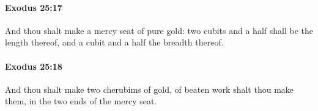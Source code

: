 		\paragraph{Exodus 25:17} %
			\label{EXODUS-25-17}

			And thou shalt make a mercy seat of pure gold: two cubits and a half shall be the length thereof, and a cubit and a half the breadth thereof.


		\paragraph{Exodus 25:18} %
			\label{EXODUS-25-18}

			And thou shalt make two cherubims of gold, of beaten work shalt thou make them, in the two ends of the mercy seat.


